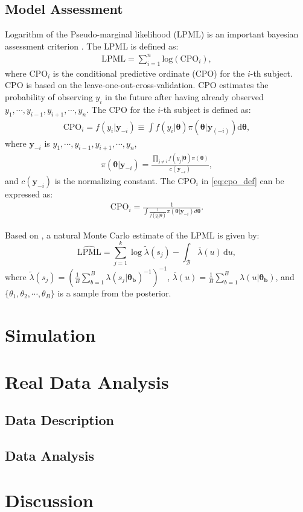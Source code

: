 \documentclass[12pt]{article}
\newcommand{\dd}{\mathrm{d}}
\begin{document}
\subsection{Model Assessment}
Logarithm of the Pseudo-marginal likelihood (LPML) is an important
bayesian assessment criterion \cite{gelfand1994bayesian}. The LPML is
defined as:
\begin{align}
  \label{eq:defLPML}
  \text{LPML} = \sum_{i=1}^{n} \text{log}(\text{CPO}_i),
\end{align}
where $\text{CPO}_i$ is the conditional predictive ordinate (CPO) for
the $i$-th subject. CPO is based on the
leave-one-out-cross-validation. CPO estimates the probability of
observing $y_i$ in the future after having already observed
$y_1,\cdots,y_{i-1},y_{i+1},\cdots,y_n$. The CPO for the $i$-th
subject is defined as:
\begin{align}
  \text{CPO}_i=f(y_i|\bm{y}_{-i}) \equiv \int f(y_i|\bm{\theta}) \pi
  (\bm{\theta}|\bm{y}_{(-i)}) \dd \bm{\theta},
  \label{eq:cpo_def}
\end{align}
where $\bm{y}_{-i}$ is $y_1,\cdots,y_{i-1},y_{i+1}, \cdots, y_n$,
\begin{align}
  \pi(\bm{\theta}|\bm{y}_{-i}) = \frac{\prod_{j\neq i}
  f(y_j|\bm{\theta}) \pi (\bm{\theta})}{c(\bm{y}_{-i})},
\end{align}
and $c(\bm{y}_{-i})$ is the normalizing constant. The $\text{CPO}_i$
in \eqref{eq:cpo_def} can be expressed as:
\begin{align}
  \text{CPO}_i=\frac{1}{\int\frac{1}{f(y_i|\bm{\theta})}\pi(\bm{\theta}|\bm{y}_{-i})d\bm{\theta}}.
  \label{eq:CPO1}
\end{align}


Based on \citet{hu2019bayesianmodel}, a natural Monte Carlo estimate
of the LPML is given by:
\begin{equation}
  \widehat{\text{LPML}} = \sum_{j=1}^k \log \widetilde{\lambda}(s_j) -
  \int_{\mathcal{B}} \overline{\lambda}(u)\, \dd u,
\end{equation}
where
$\widetilde{\lambda}(s_j)=(\frac{1}{B}\sum_{b=1}^B\lambda(s_j|\bm{\theta_b})^{-1})^{-1}$, 
$\overline{\lambda}(u)=\frac{1}{B}\sum_{b=1}^B\lambda(u|\bm{\theta_b})$,
and $\{\theta_1,\theta_2,\cdots,\theta_B\}$ is a sample from the
posterior.


\section{Simulation}\label{sec:simu}
\section{Real Data Analysis}\label{sec:real_data}
\subsection{Data Description}
\subsection{Data Analysis}

\section{Discussion}\label{sec:discussion}




\end{document}
